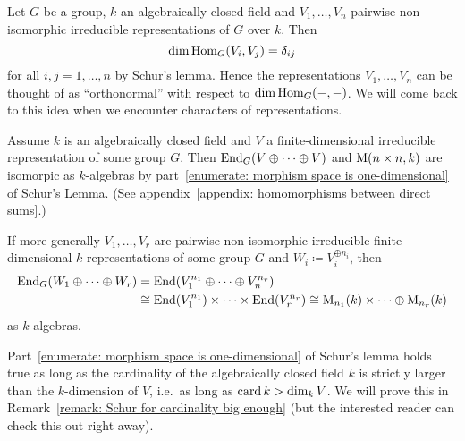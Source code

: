 \begin{remark}
  Let $G$ be a group, $k$ an algebraically closed field and $V_1, \dotsc, V_n$ pairwise non-isomorphic irreducible representations of $G$ over $k$.
  Then
  \[
      \dim \operatorname{Hom}_G(V_i, V_j)
    = \delta_{ij}
  \]
  for all $i,j = 1, \dotsc, n$ by Schur’s lemma.
  Hence the representations $V_1, \dotsc, V_n$ can be thought of as “orthonormal” with respect to $\dim \operatorname{Hom}_G(-,-)$.
  We will come back to this idea when we encounter characters of representations.
\end{remark}


\begin{remark}
  Assume $k$ is an algebraically closed field and $V$ a finite-dimensional irreducible representation of some group $G$.
  Then $\operatorname{End}_G(V \oplus \dotsb \oplus V)$ and $\operatorname{M}(n \times n, k)$ are isomorpic as $k$-algebras by part~\ref{enumerate: morphism space is one-dimensional} of Schur’s Lemma.
  (See appendix~\ref{appendix: homomorphisms between direct sums}.)
  
  If more generally $V_1, \dotsc, V_r$ are pairwise non-isomorphic irreducible finite dimensional $k$-representations of some group $G$ and $W_i \coloneqq V_i^{\oplus n_i}$, then
  \begin{align*}
            \operatorname{End}_G(W_1 \oplus \dotsb \oplus W_r)
    &=      \operatorname{End}(V_1^{n_1} \oplus \dotsb \oplus V_n^{n_r})
    \\
    &\cong  \operatorname{End}(V_1^{n_1}) \times \dotsb \times \operatorname{End}(V_r^{n_r})
     \cong  \operatorname{M}_{n_1}(k) \times \dotsb \oplus \operatorname{M}_{n_r}(k)
  \end{align*}
  as $k$-algebras.
\end{remark}


\begin{remark}
  Part~\ref{enumerate: morphism space is one-dimensional} of Schur’s lemma holds true as long as the cardinality of the algebraically closed field $k$ is strictly larger than the $k$-dimension of $V$, i.e.\ as long as $\operatorname{card} k > \dim_k V$.
  We will prove this in Remark~\ref{remark: Schur for cardinality big enough} (but the interested reader can check this out right away).
\end{remark}


